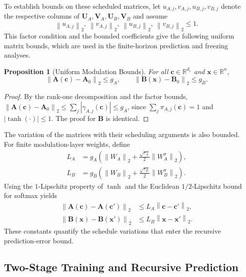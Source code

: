 \documentclass[journal]{IEEEtran}
\newtheorem{proposition}{Proposition}
\newcommand{\vx}{\mathbf{x}}
\newcommand{\vc}{\mathbf{c}}
\newcommand{\mA}{\mathbf{A}}
\newcommand{\mB}{\mathbf{B}}
\newcommand{\mU}{\mathbf{U}}
\newcommand{\mV}{\mathbf{V}}
\newcommand{\R}{\mathbb{R}}
\newcommand{\norm}[1]{\left\lVert #1\right\rVert}
\begin{document}
To establish bounds on these scheduled matrices, let $u_{A,j},v_{A,j},u_{B,j},v_{B,j}$ denote the respective columns of $\mU_A,\mV_A,\mU_B,\mV_B$ and assume
\begin{equation}
    \norm{u_{A,j}}_2,\ \norm{v_{A,j}}_2,\
    \norm{u_{B,j}}_2,\ \norm{v_{B,j}}_2\le1.
    \label{eq:factor_norm_assumption}
\end{equation}
This factor condition and the bounded coefficients give the following uniform matrix bounds, which are used in the finite-horizon prediction and freezing analyses.
\begin{proposition}[Uniform Modulation Bounds]
\label{prop:modulation_bound}
For all $\vc\in\R^{d_c}$ and $\vx\in\R^n$,
\begin{equation}
    \norm{\mA(\vc)-\mA_0}_2\le g_A,\qquad
    \norm{\mB(\vx)-\mB_0}_2\le g_B.
    \label{eq:modulation_bound}
\end{equation}
\end{proposition}
\begin{proof}
By the rank-one decomposition and the factor bounds,
$\norm{\mA(\vc)-\mA_0}_2\le\sum_j|\gamma_{A,j}(\vc)|\le g_A$,
since $\sum_j\pi_{A,j}(\vc)=1$ and $|\tanh(\cdot)|\le1$. The proof for $\mB$ is identical.
\end{proof}

The variation of the matrices with their scheduling arguments is also bounded. For finite modulation-layer weights, define
\begin{align}
    L_A&=g_A\left(\norm{W_A}_2+\frac{\sqrt{r_A}}{2}\norm{W_A^\pi}_2\right),
    \label{eq:transition_Lipschitz_constant}\\
    L_B&=g_B\left(\norm{W_B}_2+\frac{\sqrt{r_B}}{2}\norm{W_B^\pi}_2\right).
    \label{eq:Lipschitz_constants}
\end{align}
Using the $1$-Lipschitz property of $\tanh$ and the Euclidean $1/2$-Lipschitz bound for softmax yields
\begin{equation}
    \begin{aligned}
    \norm{\mA(\vc)-\mA(\vc')}_2&\le L_A\norm{\vc-\vc'}_2,\\
    \norm{\mB(\vx)-\mB(\vx')}_2&\le L_B\norm{\vx-\vx'}_2.
    \end{aligned}
    \label{eq:schedule_lipschitz}
\end{equation}
These constants quantify the schedule variations that enter the recursive prediction-error bound.

\subsection{Two-Stage Training and Recursive Prediction}
\label{sec:training}
\end{document}
